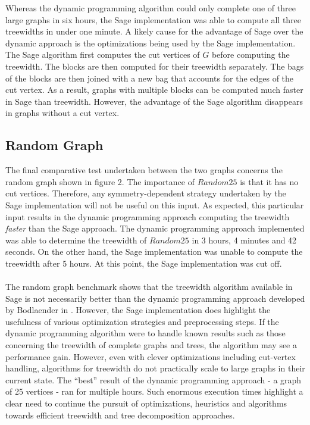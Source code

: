 \documentclass[12pt,conference]{IEEEtran}
\theoremstyle{plain}
\begin{document}
Whereas the dynamic programming algorithm could only complete one of three large graphs in six hours, the Sage implementation was able to compute all three treewidths in under one minute. A likely cause for the advantage of Sage over the dynamic approach is the optimizations being used by the Sage implementation. The Sage algorithm first computes the cut vertices of $G$ before computing the treewidth. The blocks are then computed for their treewidth separately. The bags of the blocks are then joined with a new bag that accounts for the edges of the cut vertex. As a result, graphs with multiple blocks can be computed much faster in Sage than treewidth. However, the advantage of the Sage algorithm disappears in graphs without a cut vertex.


\subsection{Random Graph}

The final comparative test undertaken between the two graphs concerns the random graph shown in figure 2. The importance of $Random25$ is that it has no cut vertices. Therefore, any symmetry-dependent strategy undertaken by the Sage implementation will not be useful on this input. As expected, this particular input results in the dynamic programming approach computing the treewidth \textit{faster} than the Sage approach. The dynamic programming approach implemented was able to determine the treewidth of $Random25$ in 3 hours, 4 minutes and 42 seconds. On the other hand, the Sage implementation was unable to compute the treewidth after 5 hours. At this point, the Sage implementation was cut off.
\\
\\
The random graph benchmark shows that the treewidth algorithm available in Sage is not necessarily better than the dynamic programming approach developed by Bodlaender in \cite{bodlaender-2012}. However, the Sage implementation does highlight the usefulness of various optimization strategies and preprocessing steps. If the dynamic programming algorithm were to handle known results such as those concerning the treewidth of complete graphs and trees, the algorithm may see a performance gain. However, even with clever optimizations including cut-vertex handling, algorithms for treewidth do not practically scale to large graphs in their current state. The ``best'' result of the dynamic programming approach - a graph of 25 vertices - ran for multiple hours. Such enormous execution times highlight a clear need to continue the pursuit of optimizations, heuristics and algorithms towards efficient treewidth and tree decomposition approaches.
\end{document}

